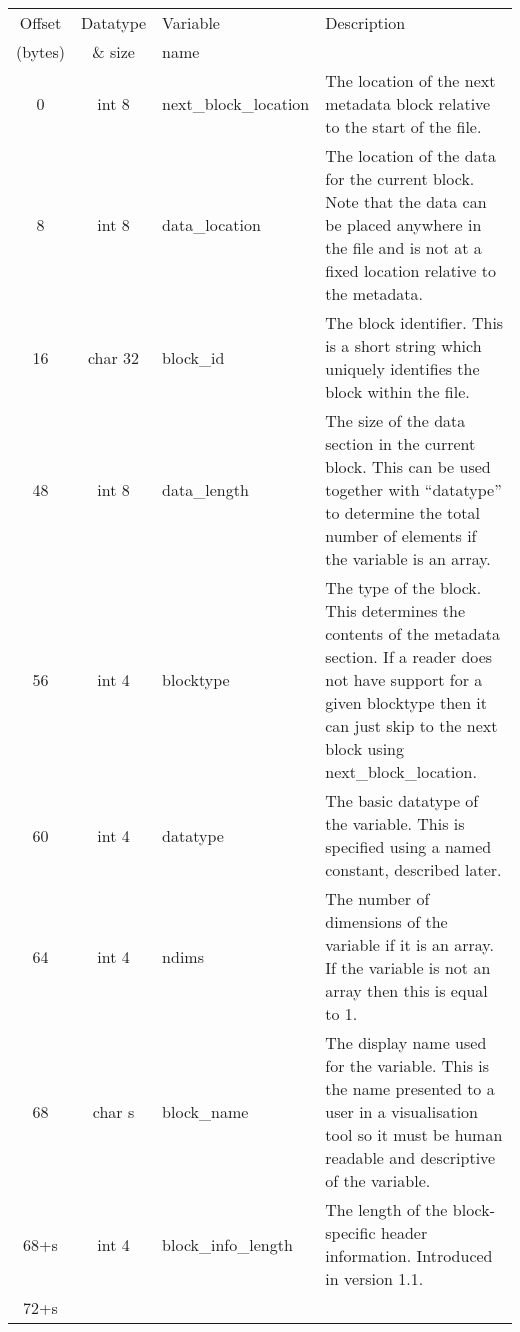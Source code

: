 \documentclass[12pt]{article}
\begin{document}
\begin{center}
\begin{tabularx}{0.9\textwidth}[!hbt]{cclX}
  Offset & Datatype & Variable & Description\\
  (bytes) & \& size & name &
  \\\toprule

  0 & int 8 & next\_block\_location & The location of the next metadata
  block relative to the start of the file.
  \\\midrule

  8 & int 8 & data\_location & The location of the data for the current block.
  Note that the data can be placed anywhere in the file and is not at a fixed
  location relative to the metadata.
  \\\midrule

  16 & char 32 & block\_id & The block identifier. This is a short string
  which uniquely identifies the block within the file.
  \\\midrule

  48 & int 8 & data\_length & The size of the data section in the current block.
  This can be used together with ``datatype'' to determine the total number
  of elements if the variable is an array.
  \\\midrule

  56 & int 4 & blocktype & The type of the block. This determines the contents
  of the metadata section. If a reader does not have support for a given
  blocktype then it can just skip to the next block using next\_block\_location.
  \\\midrule

  60 & int 4 & datatype & The basic datatype of the variable. This is
  specified using a named constant, described later.
  \\\midrule

  64 & int 4 & ndims & The number of dimensions of the variable if
  it is an array. If the variable is not an array then this is equal to 1.
  \\\midrule

  68 & char s & block\_name & The display name used for the variable. This
  is the name presented to a user in a visualisation tool so it must be
  human readable and descriptive of the variable.
  \\\midrule

  68+s & int 4 & block\_info\_length & The length of the block-specific
  header information. Introduced in version 1.1.
  \\\midrule

  72+s &
\end{tabularx}
\end{center}\vspace{10pt}
\end{document}

